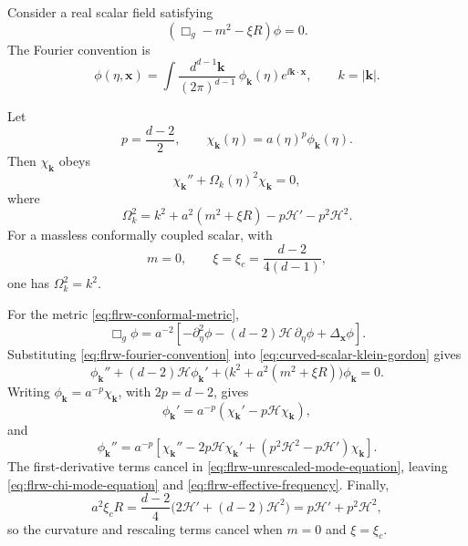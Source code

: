 Consider a real scalar field satisfying
\begin{equation}
  (\Box_g-m^2-\xi R)\phi=0.
  \label{eq:curved-scalar-klein-gordon}
\end{equation}
The Fourier convention is
\begin{equation}
  \phi(\eta,\mathbf x)
  =
  \int\frac{d^{d-1}\mathbf k}{(2\pi)^{d-1}}\,
  \phi_{\mathbf k}(\eta)e^{\ii\mathbf k\cdot\mathbf x},
  \qquad
  k=|\mathbf k|.
  \label{eq:flrw-fourier-convention}
\end{equation}

\begin{remark}
\label{rem:flrw-mode-equation}
Let
\begin{equation}
  p=\frac{d-2}{2},
  \qquad
  \chi_{\mathbf k}(\eta)=a(\eta)^p\phi_{\mathbf k}(\eta).
  \label{eq:flrw-rescaled-mode}
\end{equation}
Then \(\chi_{\mathbf k}\) obeys
\begin{equation}
  \chi_{\mathbf k}''+\Omega_k(\eta)^2\chi_{\mathbf k}=0,
  \label{eq:flrw-chi-mode-equation}
\end{equation}
where
\begin{equation}
  \Omega_k^2
  =
  k^2+a^2(m^2+\xi R)-p\mathcal H'-p^2\mathcal H^2 .
  \label{eq:flrw-effective-frequency}
\end{equation}
For a massless conformally coupled scalar, with
\begin{equation}
  m=0,
  \qquad
  \xi=\xi_c=\frac{d-2}{4(d-1)},
  \label{eq:conformal-coupling-d-dimensions}
\end{equation}
one has \(\Omega_k^2=k^2\).
\end{remark}

For the metric \eqref{eq:flrw-conformal-metric},
\[
  \Box_g\phi
  =
  a^{-2}\left[
  -\partial_\eta^2\phi
  -(d-2)\mathcal H\,\partial_\eta\phi
  +\Delta_{\mathbf x}\phi
  \right].
\]
Substituting \eqref{eq:flrw-fourier-convention} into
\eqref{eq:curved-scalar-klein-gordon} gives
\begin{equation}
  \phi_{\mathbf k}''
  +(d-2)\mathcal H\phi_{\mathbf k}'
  +
  \bigl(k^2+a^2(m^2+\xi R)\bigr)\phi_{\mathbf k}=0.
  \label{eq:flrw-unrescaled-mode-equation}
\end{equation}
Writing \(\phi_{\mathbf k}=a^{-p}\chi_{\mathbf k}\), with
\(2p=d-2\), gives
\[
  \phi_{\mathbf k}'
  =
  a^{-p}(\chi_{\mathbf k}'-p\mathcal H\chi_{\mathbf k}),
\]
and
\[
  \phi_{\mathbf k}''
  =
  a^{-p}\left[
  \chi_{\mathbf k}''
  -2p\mathcal H\chi_{\mathbf k}'
  +(p^2\mathcal H^2-p\mathcal H')\chi_{\mathbf k}
  \right].
\]
The first-derivative terms cancel in
\eqref{eq:flrw-unrescaled-mode-equation}, leaving
\eqref{eq:flrw-chi-mode-equation} and
\eqref{eq:flrw-effective-frequency}.  Finally,
\[
  a^2\xi_c R
  =
  \frac{d-2}{4}
  \bigl(2\mathcal H'+(d-2)\mathcal H^2\bigr)
  =
  p\mathcal H'+p^2\mathcal H^2,
\]
so the curvature and rescaling terms cancel when \(m=0\) and
\(\xi=\xi_c\).

